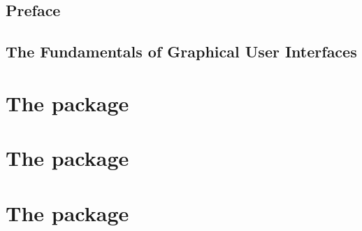 \documentclass[showtrims, letterpaper]{memoir}
\begin{document}
\thispagestyle{empty}
%

\frontmatter

\chapter*{Preface}
\label{chap:preface}

\newpage



\setcounter{tocdepth}{3}
\tableofcontents
\newpage



\graphicspath{
  {ch-Preface/}
  {ch-GUIBasics/}
  {ch-ProgrammingPractices/}
  {ch-gWidgets/}
  {ch-RGtk2/}
  {ch-Qt/}
  {ch-tcltk/}
}


\mainmatter
\chapter{The Fundamentals of Graphical User Interfaces}
\label{chap:GUIBasics}






\part{The  package}
\label{chap:gWidgets-intro}



\part{The  package}
\label{chap:RGtk2}


\part{The  package}
\label{chap:Qt}

\end{document}
